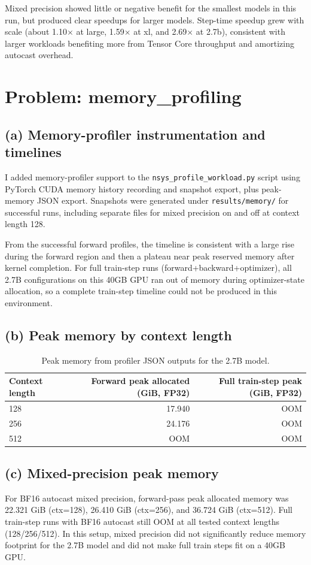 \documentclass[11pt]{article}
\begin{document}
Mixed precision showed little or negative benefit for the smallest models in this run, but produced clear speedups for larger models. Step-time speedup grew with scale (about 1.10$\times$ at large, 1.59$\times$ at xl, and 2.69$\times$ at 2.7b), consistent with larger workloads benefiting more from Tensor Core throughput and amortizing autocast overhead.

\section{Problem: memory\_profiling}
\subsection*{(a) Memory-profiler instrumentation and timelines}
I added memory-profiler support to the \texttt{nsys\_profile\_workload.py} script using PyTorch CUDA memory history recording and snapshot export, plus peak-memory JSON export. Snapshots were generated under \texttt{results/memory/} for successful runs, including separate files for mixed precision on and off at context length 128.

From the successful forward profiles, the timeline is consistent with a large rise during the forward region and then a plateau near peak reserved memory after kernel completion. For full train-step runs (forward+backward+optimizer), all 2.7B configurations on this 40GB GPU ran out of memory during optimizer-state allocation, so a complete train-step timeline could not be produced in this environment.

\subsection*{(b) Peak memory by context length}
\begin{table}[h]
\centering
\begin{tabular}{lrr}
\toprule
Context length & Forward peak allocated (GiB, FP32) & Full train-step peak (GiB, FP32) \\
\midrule
128 & 17.940 & OOM \\
256 & 24.176 & OOM \\
512 & OOM & OOM \\
\bottomrule
\end{tabular}
\caption{Peak memory from profiler JSON outputs for the 2.7B model.}
\end{table}

\subsection*{(c) Mixed-precision peak memory}
For BF16 autocast mixed precision, forward-pass peak allocated memory was 22.321 GiB (ctx=128), 26.410 GiB (ctx=256), and 36.724 GiB (ctx=512). Full train-step runs with BF16 autocast still OOM at all tested context lengths (128/256/512). In this setup, mixed precision did not significantly reduce memory footprint for the 2.7B model and did not make full train steps fit on a 40GB GPU.
\end{document}
